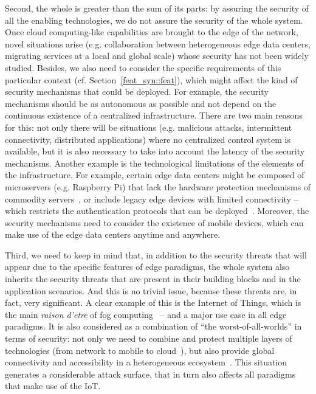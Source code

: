 \documentclass[twocolumn,preprint,3p]{elsarticle}
\begin{document}
Second, the whole is greater than the sum of its parts: by assuring the security of all the enabling technologies, we do not assure the security of the whole system. Once cloud computing-like capabilities are brought to the edge of the network, novel situations arise (e.g. collaboration between heterogeneous edge data centers, migrating services at a local and global scale) whose security has not been widely studied. Besides, we also need to consider the specific requirements of this particular context (cf. Section~\ref{feat_syn::feat}), which might affect the kind of security mechanisms that could be deployed. For example, the security mechanisms should be as autonomous as possible and not depend on the continuous existence of a centralized infrastructure. There are two main reasons for this: not only there will be situations (e.g. malicious attacks, intermittent connectivity, distributed applications) where no centralized control system is available, but it is also necessary to take into account the latency of the security mechanisms. Another example is the technological limitations of the elements of the infrastructure. For example, certain edge data centers might be composed of microservers (e.g. Raspberry Pi) that lack the hardware protection mechanisms of commodity servers~\cite{Manco2015}, or include legacy edge devices with limited connectivity -- which restricts the authentication protocols that can be deployed~\cite{StojmenovicFSec05}. Moreover, the security mechanisms need to consider the existence of mobile devices, which can make use of the edge data centers anytime and anywhere.

Third, we need to keep in mind that, in addition to the security threats that will appear due to the specific features of edge paradigms, the whole system also inherits the security threats that are present in their building blocks and in the application scenarios. And this is no trivial issue, because these threats are, in fact, very significant. A clear example of this is the Internet of Things, which is the main \textit{raison d'etre} of fog computing~\cite{Bonomi12} -- and a major use case in all edge paradigms. It is also considered as a combination of ``the worst-of-all-worlds'' in terms of security: not only we need to combine and protect multiple layers of technologies (from network to mobile to cloud~\cite{Miessler15}), but also provide global connectivity and accessibility in a heterogeneous ecosystem~\cite{Roman2013}. This situation generates a considerable attack surface, that in turn also affects all paradigms that make use of the IoT.
\end{document}
